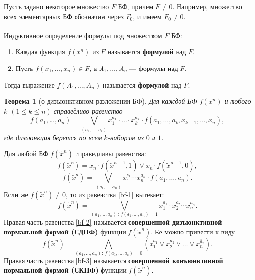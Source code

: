 \documentclass[a4paper, 12pt]{report}
\numberwithin{equation}{section}
\renewcommand{\leq}{\leqslant}
\newtheorem*{theorem}{Теорема}
\begin{document}
	Пусть задано некоторое множество $F$ БФ, причем $F \neq 0$. Например, множество всех элементарных БФ обозначим через $F_0$, и имеем $F_0 \neq 0$.
	\\\\
	Индуктивное определение формулы под множеством $F$ БФ:
	\begin{enumerate}
		\item Каждая функция $f(x^n)$ из $F$ называется \textbf{формулой} над $F$.
		\item Пусть $f(x_1, \dots, x_n) \in F$, а $A_1, \dots, A_n$ — формулы над $F$.
	\end{enumerate}
	Тогда выражение $f(A_1, \dots, A_n)$ называется \textbf{формулой} над $F$.
	\begin{theorem}[о дизъюнктивном разложении БФ]
		Для каждой БФ $f(x^n)$ и любого $k$ $(1 \leq k \leq n)$ справедливо равенство
		\[
		f(a_1, \dots, a_n) = \bigvee_{(a_1, \dots, a_k)} x_1^{a_1}\cdot \ldots \cdot x_k^{a_k}\cdot f(a_1,\ldots, a_k,x_{k+1},\ldots, x_n),
		\]
		где дизъюнкция берется по всем $k$-наборам из $0$ и $1$.
	\end{theorem}
	Для любой БФ $f(\widetilde{x}^n)$ справедливы равенства:
	\begin{equation}
		f(\widetilde{x}^n) = x_n \cdot f(\widetilde{x}^{n-1}, 1) \lor \overline{x_n} \cdot f(\widetilde{x}^{n-1}, 0),
	\end{equation}
	\begin{equation}
		\label{bf-1}
		f(\widetilde{x}^n) = \bigvee_{(a_1, \dots, a_n)} x_1^{a_1} \cdots x_n^{a_n} \cdot f(a_1, \dots, a_n). 
	\end{equation}
	Если же $f(\widetilde{x}^n) \neq 0$, то из равенства \eqref{bf-1} вытекает:
	\begin{equation}
		\label{bf-2}
		f(\widetilde{x}^n) = \bigvee_{(a_1, \dots, a_n) \,:\, f(a_1, \dots, a_n) = 1} x_1^{a_1} \cdot x_2^{a_2} \cdots x_n^{a_n}.
	\end{equation}
	Правая часть равенства \eqref{bf-2} называется \textbf{совершенной дизъюнктивной нормальной формой (СДНФ)} функции $f(\widetilde{x}^n)$.
	Ее можно привести к виду
	\begin{equation}
		\label{bf-3}
		f(\widetilde{x}^n) = \bigwedge_{(a_1, \dots, a_n) \,:\, f(a_1, \dots, a_n) = 0} (x_1^{\overline a_1} \vee x_2^{\overline a_2} \vee \ldots \vee  x_n^{\overline a_n}).
	\end{equation}
	Правая часть равенства \eqref{bf-3} называется \textbf{совершенной конъюнктивной нормальной формой (СКНФ)} функции $f(\widetilde{x}^n)$.
	\\\\
\end{document}
